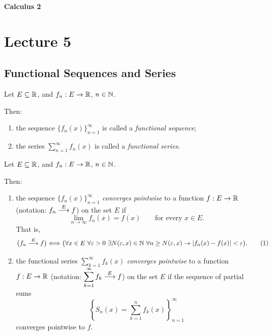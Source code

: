 
{\large\bfseries Calculus 2}

\section{Lecture 5}
\subsection*{Functional Sequences and Series}

\begin{definition}\label{def:5.1}
Let $E\subseteq\mathbb{R}$, and $f_n:E\to\mathbb{R}$, $n\in\mathbb{N}$.

Then:
\begin{enumerate}
    \item\label{item:definition:5.1:1} the sequence $\{f_n(x)\}_{n=1}^{\infty}$ is called a \emph{functional sequence};
    \item\label{item:definition:5.1:2} the series $\displaystyle\sum_{n=1}^{\infty}f_n(x)$ is called a \emph{functional series}.
\end{enumerate}
\end{definition}

\begin{definition}\label{def:5.2}
Let $E\subseteq\mathbb{R}$, and $f_n:E\to\mathbb{R}$, $n\in\mathbb{N}$.

Then:
\begin{enumerate}
    \item\label{item:definition:5.2:1} the sequence $\{f_n(x)\}_{n=1}^{\infty}$ \emph{converges pointwise} to a function $f:E\to\mathbb{R}$ (notation: $f_n\mathrel{\overset{E}{\longrightarrow}}f$) on the set $E$ if
    \[
    \lim_{n\to\infty}f_n(x)=f(x)\qquad\text{for every }x\in E.
    \]
    That is,
    \[
    \bigl(f_n\mathrel{\overset{E}{\longrightarrow}}f\bigr)
    \Longleftrightarrow
    \bigl(\forall x\in E\ \forall\varepsilon>0\ \exists N(\varepsilon,x)\in\mathbb{N}\ \forall n\ge N(\varepsilon,x)
    \to |f_n(x)-f(x)|<\varepsilon\bigr).
    \tag{1}\label{eq:5:1:1}
    \]

    \item\label{item:definition:5.2:2} the functional series $\displaystyle\sum_{k=1}^{\infty}f_k(x)$ \emph{converges pointwise} to a function $f:E\to\mathbb{R}$ (notation: $\displaystyle\sum_{k=1}^{\infty}f_k\mathrel{\overset{E}{\longrightarrow}}f$) on the set $E$ if the sequence of partial sums
    \[
    \left\{S_n(x)=\sum_{k=1}^{n}f_k(x)\right\}_{n=1}^{\infty}
    \]
    converges pointwise to $f$.
\end{enumerate}
\end{definition}

